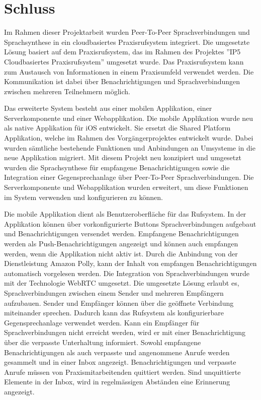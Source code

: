 \section{Schluss}

Im Rahmen dieser Projektarbeit wurden Peer-To-Peer Sprachverbindungen und Sprachsynthese in ein cloudbasiertes Praxisrufsystem integriert.
Die umgesetzte Lösung basiert auf dem Praxisrufsystem, das im Rahmen des Projektes ''IP5 Cloudbasiertes Praxisrufsystem'' umgesetzt wurde.
Das Praxisrufsystem kann zum Austausch von Informationen in einem Praxisumfeld verwendet werden.
Die Kommunikation ist dabei über Benachrichtigungen und Sprachverbindungen zwischen mehreren Teilnehmern möglich.

Das erweiterte System besteht aus einer mobilen Applikation, einer Serverkomponente und einer Webapplikation.
Die mobile Applikation wurde neu als native Applikation für iOS entwickelt.
Sie ersetzt die Shared Platform Applikation, welche im Rahmen des Vorgängerprojektes entwickelt wurde.
Dabei wurden sämtliche bestehende Funktionen und Anbindungen an Umsysteme in die neue Applikation migriert.
Mit diesem Projekt neu konzipiert und umgesetzt wurden die Sprachsynthese für empfangene Benachrichtigungen sowie die Integration einer Gegensprechanlage über Peer-To-Peer Sprachverbindungen.
Die Serverkomponente und Webapplikation wurden erweitert, um diese Funktionen im System verwenden und konfigurieren zu können.

Die mobile Applikation dient als Benutzeroberfläche für das Rufsystem.
In der Applikation können über vorkonfigurierte Buttons Sprachverbindungen aufgebaut und Benachrichtigungen versendet werden.
Empfangene Benachrichtigungen werden als Push-Benachrichtigungen angezeigt und können auch empfangen werden, wenn die Applikation nicht aktiv ist.
Durch die Anbindung von der Dienstleistung Amazon Polly, kann der Inhalt von empfangen Benachrichtigungen automatisch vorgelesen werden.
Die Integration von Sprachverbindungen wurde mit der Technologie WebRTC umgesetzt.
Die umgesetzte Lösung erlaubt es, Sprachverbindungen zwischen einem Sender und mehreren Empfängern aufzubauen.
Sender und Empfänger können über die geöffnete Verbindung miteinander sprechen.
Dadurch kann das Rufsystem als konfigurierbare Gegensprechanlage verwendet werden.
Kann ein Empfänger für Sprachverbindungen nicht erreicht werden, wird er mit einer Benachrichtigung über die verpasste Unterhaltung informiert.
Sowohl empfangene Benachrichtigungen als auch verpasste und angenommene Anrufe werden gesammelt und in einer Inbox angezeigt.
Benachrichtigungen und verpasste Anrufe müssen von Praxismitarbeitenden quittiert werden.
Sind unquittierte Elemente in der Inbox, wird in regelmässigen Abständen eine Erinnerung angezeigt.

